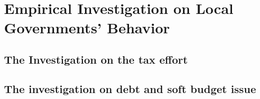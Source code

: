 
\chapter{Empirical Investigation on Local Governments' Behavior}




\section{The Investigation on the tax effort}
\section{The investigation on debt and soft budget issue}



